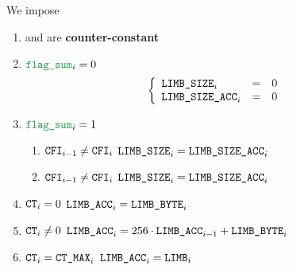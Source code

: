 We impose
\begin{enumerate}
    \item \romColumnLimbByteSize{} and \romColumnLimbByteSizeAcc{} are \textbf{counter-constant}
    \item \If $\flagSum _{i} = 0$ \Then
	\[
	    \left\{ \begin{array}{lcl}
		\texttt{LIMB\_SIZE}     _{i} & = & 0 \\
		\texttt{LIMB\_SIZE\_ACC}  _{i} & = & 0 \\
	    \end{array} \right.
	\]
    \item \If $\flagSum _{i} = 1$ \Then
	\begin{enumerate}
	    \item \If $\texttt{CFI} _{i - 1} \neq \texttt{CFI} _{i}$ \Then $\texttt{LIMB\_SIZE} _{i} = \texttt{LIMB\_SIZE\_ACC}  _{i}$
	    \item \If $\texttt{CFI} _{i - 1} \neq \texttt{CFI} _{i}$ \Then $\texttt{LIMB\_SIZE} _{i} = \texttt{LIMB\_SIZE\_ACC}  _{i}$
	\end{enumerate}
    \item \If $\texttt{CT} _{i} =    0$           \Then $\texttt{LIMB\_ACC} _{i} = \texttt{LIMB\_BYTE} _{i}$
    \item \If $\texttt{CT} _{i} \neq 0$           \Then $\texttt{LIMB\_ACC} _{i} = 256 \cdot \texttt{LIMB\_ACC} _{i - 1} + \texttt{LIMB\_BYTE} _{i}$
    \item \If $\texttt{CT} _{i} =    \texttt{CT\_MAX} _{i}$ \Then $\texttt{LIMB\_ACC} _{i} = \texttt{LIMB} _{i}$
\end{enumerate}

